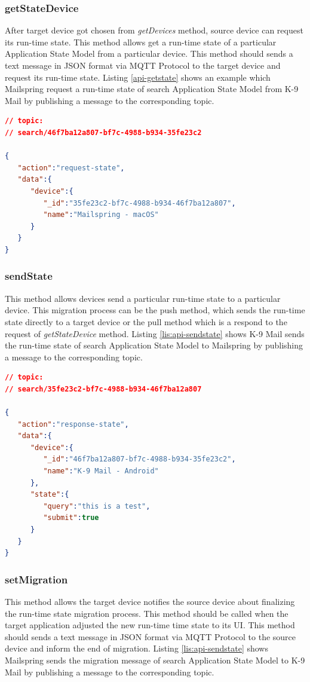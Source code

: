 \subsubsection{getStateDevice}
After target device got chosen from \textit{getDevices} method, source device can request its run-time state. This method allows get a run-time state of a particular Application State Model from a particular device. This method should sends a text message in JSON format via MQTT Protocol to the target device and request its run-time state. Listing \ref{api-getstate} shows an example which Mailspring request a run-time state of search Application State Model from K-9 Mail by publishing a message to the corresponding topic.

\lstset{
  label=lis:api-getstate,caption=Mailspring request a run-time state from K-9 Mail.
}
\begin{lstlisting}[language=json]
// topic:
// search/46f7ba12a807-bf7c-4988-b934-35fe23c2

{
   "action":"request-state",
   "data":{
      "device":{
         "_id":"35fe23c2-bf7c-4988-b934-46f7ba12a807",
         "name":"Mailspring - macOS"
      }
   }
}
\end{lstlisting}
\subsubsection{sendState}
This method allows devices send a particular run-time state to a particular device. This migration process can be the push method, which sends the run-time state directly to a target device or the pull method which is a respond to the request of \textit{getStateDevice} method. Listing \ref{lis:api-sendstate} shows K-9 Mail sends the run-time state of search Application State Model to Mailspring by publishing a message to the corresponding topic.

\lstset{
  label=lis:api-sendstate,caption=K-9 Mail sends run-time state of search to Mailspring.
}
\begin{lstlisting}[language=json]
// topic:
// search/35fe23c2-bf7c-4988-b934-46f7ba12a807

{
   "action":"response-state",
   "data":{
      "device":{
         "_id":"46f7ba12a807-bf7c-4988-b934-35fe23c2",
         "name":"K-9 Mail - Android"
      },
      "state":{
         "query":"this is a test",
         "submit":true
      }
   }
}
\end{lstlisting}

\subsubsection{setMigration}
This method allows the target device notifies the source device about finalizing the run-time state migration process. This method should be called when the target application adjusted the new run-time time state to its UI. This method should sends a text message in JSON format via MQTT Protocol to the source device and inform the end of migration. Listing \ref{lis:api-sendstate} shows Mailspring sends the migration message of search Application State Model to K-9 Mail by publishing a message to the corresponding topic.

